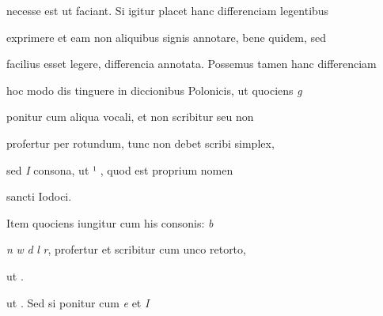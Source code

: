 necesse est ut faciant. Si igitur placet hanc differenciam legentibus

exprimere et eam non aliquibus signis annotare, bene quidem, sed

facilius esset legere, differencia annotata. Possemus tamen hanc differenciam

hoc modo dis tinguere in diccionibus Polonicis, ut quociens \textit{g}

ponitur cum aliqua vocali, et non scribitur seu non

profertur per  rotundum, tunc non debet scribi  simplex,

sed \textit{I} consona, ut ¹  , quod est proprium nomen 

\splitlines

sancti Iodoci.

\indentK Item quociens iungitur cum his consonis: \textit{b} 

\fulllines

\textit{n} \textit{w} \textit{d} \textit{l} \textit{r}, profertur et scribitur cum unco retorto, 


\fullpreviouslines

{
\color{blue}

ut    . 

}


\fulllines


ut    . Sed si ponitur cum \textit{e} et \textit{I}


\endinput








«s -yy rfep.; v.





\catcode `\^^M=5

  \newtip{48}{Łoś niesłusznie uważa, że \textit{bika} w obu wypadkach
    napisano błędnie zamiast \textit{ƀyka}. Przykłady są bowiem podane
    w~pisowni dotychczasowej dla pokazania jej niewystarczalności do
    zróżnicowania wyrazów \textit{bika} i \textit{byka}.} 

